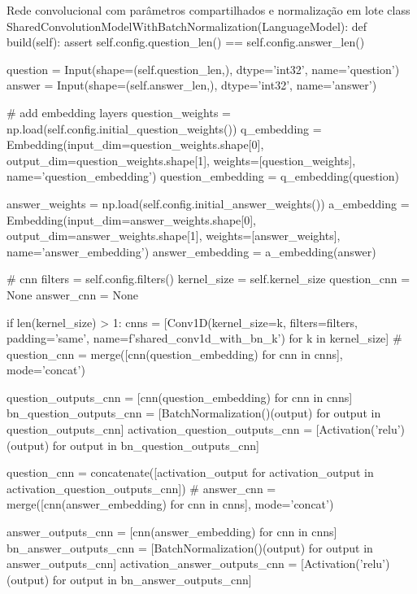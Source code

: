 \begin{mypython-linenumber}{Rede convolucional com parâmetros compartilhados e normalização em lote}
class SharedConvolutionModelWithBatchNormalization(LanguageModel):
    def build(self):
        assert self.config.question_len() == self.config.answer_len()

        question = Input(shape=(self.question_len,), dtype='int32', name='question')
        answer = Input(shape=(self.answer_len,), dtype='int32', name='answer')

        # add embedding layers
        question_weights = np.load(self.config.initial_question_weights())
        q_embedding = Embedding(input_dim=question_weights.shape[0],
                                output_dim=question_weights.shape[1],
                                weights=[question_weights],
                                name='question_embedding')
        question_embedding = q_embedding(question)

        answer_weights = np.load(self.config.initial_answer_weights())
        a_embedding = Embedding(input_dim=answer_weights.shape[0],
                                output_dim=answer_weights.shape[1],
                                weights=[answer_weights],
                                name='answer_embedding')
        answer_embedding = a_embedding(answer)

        # cnn
        filters = self.config.filters()
        kernel_size = self.kernel_size
        question_cnn = None
        answer_cnn = None

        if len(kernel_size) > 1:
            cnns = [Conv1D(kernel_size=k,
                           filters=filters,
                           padding='same',
                           name=f'shared_conv1d_with_bn_{k}') for k in kernel_size]
            # question_cnn = merge([cnn(question_embedding) for cnn in cnns], mode='concat')

            question_outputs_cnn = [cnn(question_embedding) for cnn in cnns]
            bn_question_outputs_cnn = [BatchNormalization()(output) for output in question_outputs_cnn]
            activation_question_outputs_cnn = [Activation('relu')(output) for output in bn_question_outputs_cnn]

            question_cnn = concatenate([activation_output for activation_output in activation_question_outputs_cnn])
            # answer_cnn = merge([cnn(answer_embedding) for cnn in cnns], mode='concat')

            answer_outputs_cnn = [cnn(answer_embedding) for cnn in cnns]
            bn_answer_outputs_cnn = [BatchNormalization()(output) for output in answer_outputs_cnn]
            activation_answer_outputs_cnn = [Activation('relu')(output) for output in bn_answer_outputs_cnn]


\end{mypython-linenumber}
